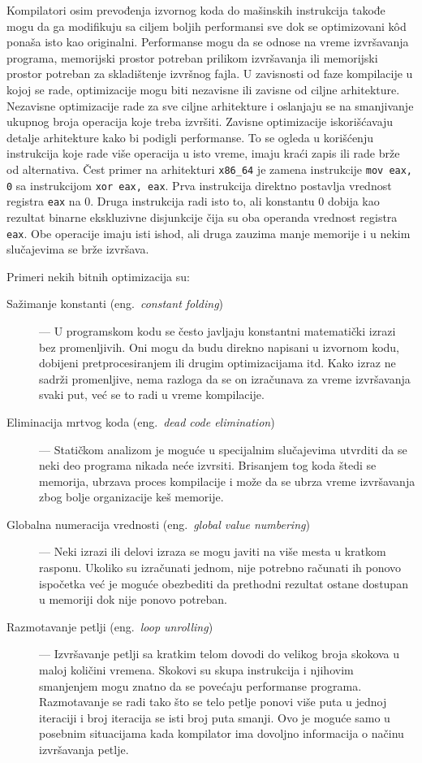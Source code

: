 \documentclass[12pt,oneside]{memoir}
\begin{document}
Kompilatori osim prevođenja izvornog koda do mašinskih instrukcija takođe mogu da ga modifikuju sa ciljem boljih performansi sve dok se optimizovani k\^od ponaša isto kao originalni.
Performanse mogu da se odnose na vreme izvršavanja programa, memorijski prostor potreban prilikom izvršavanja ili memorijski prostor potreban za skladištenje izvršnog fajla.
U zavisnosti od faze kompilacije u kojoj se rade, optimizacije mogu biti nezavisne ili zavisne od ciljne arhitekture. %
Nezavisne optimizacije rade za sve ciljne arhitekture i oslanjaju se na smanjivanje ukupnog broja operacija koje treba izvršiti.
Zavisne optimizacije iskorišćavaju detalje arhitekture kako bi podigli performanse.
To se ogleda u korišćenju instrukcija koje rade više operacija u isto vreme, imaju kraći zapis ili rade brže od alternativa.
Čest primer na arhitekturi \verb|x86_64| je zamena instrukcije \verb|mov eax, 0| sa instrukcijom \verb|xor eax, eax|.
Prva instrukcija direktno postavlja vrednost registra \verb|eax| na 0.
Druga instrukcija radi isto to, ali konstantu 0 dobija kao rezultat binarne ekskluzivne disjunkcije čija su oba operanda vrednost registra \verb|eax|.
Obe operacije imaju isti ishod, ali druga zauzima manje memorije i u nekim slučajevima se brže izvršava.

Primeri nekih bitnih optimizacija su:
\begin{description}
  \item[Sažimanje konstanti (eng.~{\em constant folding})] --- U programskom kodu se često javljaju konstantni matematički izrazi bez promenljivih. Oni mogu da budu direkno napisani u izvornom kodu, dobijeni pretprocesiranjem ili drugim optimizacijama itd. Kako izraz ne sadrži promenljive, nema razloga da se on izračunava za vreme izvršavanja svaki put, već se to radi u vreme kompilacije.
  \item[Eliminacija mrtvog koda (eng.~{\em dead code elimination})] --- Statičkom analizom je moguće u specijalnim slučajevima utvrditi da se neki deo programa nikada neće izvrsiti. Brisanjem tog koda štedi se memorija, ubrzava proces kompilacije i može da se ubrza vreme izvršavanja zbog bolje organizacije keš memorije.
  \item[Globalna numeracija vrednosti (eng.~{\em global value numbering})] --- Neki izrazi ili delovi izraza se mogu javiti na više mesta u kratkom rasponu. Ukoliko su izračunati jednom, nije potrebno računati ih ponovo ispočetka već je moguće obezbediti da prethodni rezultat ostane dostupan u memoriji dok nije ponovo potreban.
  \item[Razmotavanje petlji (eng.~{\em loop unrolling})] --- Izvršavanje petlji sa kratkim telom dovodi do velikog broja skokova u maloj količini vremena. Skokovi su skupa instrukcija i njihovim smanjenjem mogu znatno da se povećaju performanse programa. Razmotavanje se radi tako što se telo petlje ponovi više puta u jednoj iteraciji i broj iteracija se isti broj puta smanji. Ovo je moguće samo u posebnim situacijama kada kompilator ima dovoljno informacija o načinu izvršavanja petlje.
\end{description}
\end{document}
